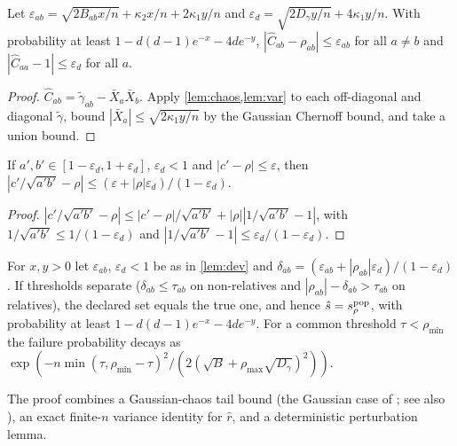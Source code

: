 \begin{lemma}\label{lem:dev}
Let $\varepsilon_{ab}=\sqrt{2B_{ab}x/n}+\kappa_2x/n+2\kappa_1y/n$ and
$\varepsilon_d=\sqrt{2D_\gamma y/n}+4\kappa_1y/n$. With probability at least
$1-d(d{-}1)e^{-x}-4de^{-y}$, $|\hat C_{ab}-\rho_{ab}|\le\varepsilon_{ab}$ for all
$a\ne b$ and $|\hat C_{aa}-1|\le\varepsilon_d$ for all $a$.
\end{lemma}
\begin{proof}
$\hat C_{ab}=\tilde\gamma_{ab}-\bar X_a\bar X_b$. Apply \cref{lem:chaos,lem:var}
to each off-diagonal and diagonal $\tilde\gamma$, bound $|\bar X_a|\le
\sqrt{2\kappa_1y/n}$ by the Gaussian Chernoff bound, and take a union bound.
\end{proof}

\begin{lemma}\label{lem:pert}
If $a',b'\in[1-\varepsilon_d,1+\varepsilon_d]$, $\varepsilon_d<1$ and
$|c'-\rho|\le\varepsilon$, then
$|c'/\sqrt{a'b'}-\rho|\le(\varepsilon+|\rho|\varepsilon_d)/(1-\varepsilon_d)$.
\end{lemma}
\begin{proof}
$|c'/\sqrt{a'b'}-\rho|\le|c'-\rho|/\sqrt{a'b'}+|\rho||1/\sqrt{a'b'}-1|$, with
$1/\sqrt{a'b'}\le1/(1-\varepsilon_d)$ and $|1/\sqrt{a'b'}-1|\le\varepsilon_d/(1-\varepsilon_d)$.
\end{proof}

\begin{theorem}\label{thm:f1}
For $x,y>0$ let $\varepsilon_{ab}$, $\varepsilon_d<1$ be as in \cref{lem:dev} and
$\delta_{ab}=(\varepsilon_{ab}+|\rho_{ab}|\varepsilon_d)/(1-\varepsilon_d)$. If
thresholds separate ($\delta_{ab}\le\tau_{ab}$ on non-relatives and
$|\rho_{ab}|-\delta_{ab}>\tau_{ab}$ on relatives), the declared set equals the true
one, and hence $\hat s=s_\rho^{\mathrm{pop}}$, with probability at least
$1-d(d{-}1)e^{-x}-4de^{-y}$. For a common threshold $\tau<\rho_{\min}$ the
failure probability decays as
$\exp(-n\min(\tau,\rho_{\min}-\tau)^2/(2(\sqrt B+\rho_{\max}\sqrt{D_\gamma})^2))$.
\end{theorem}
The proof combines a Gaussian-chaos tail bound (the Gaussian case of
\citealp[Prop.~1]{hsu2012tail}; see also \citealp{laurent2000adaptive}), an exact
finite-$n$ variance identity for $\hat r$, and a deterministic perturbation
lemma.

